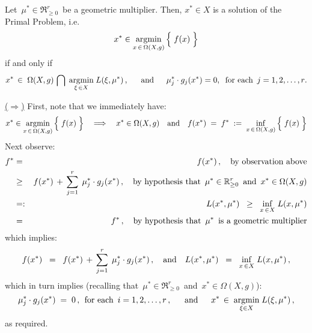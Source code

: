\vskip 1.0cm
\begin{proposition}
\label{GeometricMultipliersCharacterizePrimalSolutions}
\mbox{}
\vskip -0.3cm
\noindent
Let \,$\mu^{*} \in \Re^{r}_{\geq 0}$\, be a geometric multiplier.
Then, $x^{*} \in X$ is a solution of the Primal Problem, i.e.
\begin{equation*}
x^{*} \in \underset{x\,\in\,\Omega(X,g)}{\argmin}\left\{\;\overset{{\color{white}.}}{f(x)}\;\right\}
\end{equation*}
if and only if
\begin{equation*}
x^{*} \,\in\; \Omega(X,g) \,\bigcap\; \underset{\xi\,\in X}{\argmin}\;L(\xi,\mu^{*})\,,\;\;
\quad\textnormal{and}\quad\;\;
\mu_{j}^{*} \cdot g_{j}(x^{*}) = 0, \;\;\textnormal{for each \,$j = 1,2,\ldots,r$}.
\end{equation*}
\end{proposition}
\proof
\mbox{}
\vskip 0.1cm
\noindent
\underline{($\Longrightarrow$)}
\quad
First, note that we immediately have:
\begin{equation*}
x^{*} \in \underset{x\,\in\,\Omega(X,g)}{\argmin}\left\{\;\overset{{\color{white}.}}{f(x)}\;\right\}
\quad\Longrightarrow\quad
x^{*} \in \Omega(X,g)
\quad\textnormal{and}\quad
f(x^{*})
\; = \;
	f^{*}
\; := \;
	\underset{x\,\in\,\Omega(X,g)}{\inf}\left\{\;
		\overset{{\color{white}.}}{f(x)}
		\;\right\}
\end{equation*}
Next observe:
\begin{eqnarray*}
f^{*}
& = &
	f(x^{*})\,,
	\quad\textnormal{by observation above}
\\
& \geq &
	f(x^{*}) \,+\, \overset{r}{\underset{j=1}{\sum}}\;\,\mu_{j}^{*} \cdot g_{j}(x^{*})\,,
	\quad\textnormal{by hypothesis that \,$\mu^{*} \in \Re^{r}_{\geq 0}$\, and \,$x^{*} \in \Omega(X,g)$}
\\
& =: &
	L(x^{*},\mu^{*})
\;\; \geq \;\;
	\underset{x\,\in X}{\inf}\;L(x,\mu^{*})
\\
& = &
	f^{*}\,,
	\quad\textnormal{by hypothesis that \,$\mu^{*}$\, is a geometric multiplier}
\end{eqnarray*}
which implies:
\begin{equation*}
f(x^{*})
\;\; = \;\;
	f(x^{*}) \,+\, \overset{r}{\underset{j=1}{\sum}}\;\,\mu_{j}^{*} \cdot g_{j}(x^{*})\,,
\quad\textnormal{and}\quad
L(x^{*},\mu^{*})
\;\; = \;\;
	\underset{x\,\in X}{\inf}\;L(x,\mu^{*})\,,
\end{equation*}
which in turn implies (recalling that \,$\mu^{*} \in \Re^{r}_{\geq 0}$\, and \,$x^{*} \in \Omega(X,g)$):
\begin{equation*}
\mu_{j}^{*} \cdot g_{j}(x^{*}) \; = \; 0\,,\;\,\textnormal{for each \,$i = 1,2,\ldots, r$}\,,
\;\;\quad\textnormal{and}\quad\;\;
x^{*} \,\in\; \underset{\xi\in X}{\argmin}\;L(\xi,\mu^{*})\,,
\end{equation*}
as required.

